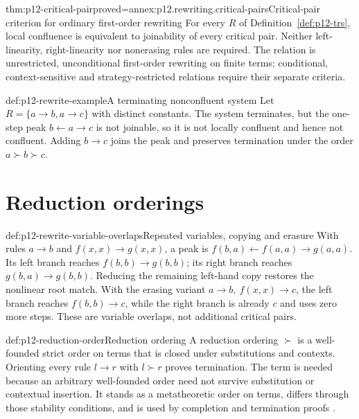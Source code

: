 \begin{hbtheorem}{thm:p12-critical-pair}{proved=annex:p12.rewriting.critical-pairs}{Critical-pair criterion for ordinary first-order rewriting}
For every \(R\) of Definition~\ref{def:p12-trs}, local confluence is
equivalent to joinability of every critical pair. Neither left-linearity,
right-linearity nor nonerasing rules are required. The relation is
unrestricted, unconditional first-order rewriting on finite terms;
conditional, context-sensitive and strategy-restricted relations require
their separate criteria.
\end{hbtheorem}

\begin{hbexample}{def:p12-rewrite-example}{A terminating nonconfluent system}
Let \(R=\{a\to b,a\to c\}\) with distinct constants. The system terminates,
but the one-step peak \(b\leftarrow a\to c\) is not joinable, so it is not
locally confluent and hence not confluent. Adding \(b\to c\) joins the peak
and preserves termination under the order \(a\succ b\succ c\).
\end{hbexample}

\section{Reduction orderings}

\begin{hbexample}{def:p12-rewrite-variable-overlaps}{Repeated variables, copying and erasure}
With rules \(a\to b\) and \(f(x,x)\to g(x,x)\), a peak is
\(f(b,a)\leftarrow f(a,a)\to g(a,a)\).
Its left branch reaches \(f(b,b)\to g(b,b)\); its right branch
reaches \(g(b,a)\to g(b,b)\). Reducing the remaining left-hand
copy restores the nonlinear root match. With the erasing variant
\(a\to b,\ f(x,x)\to c\), the left branch reaches
\(f(b,b)\to c\), while the right branch is already \(c\) and
uses zero more steps. These are variable overlaps, not additional
critical pairs.
\end{hbexample}

\begin{hbdefinition}{def:p12-reduction-order}{Reduction ordering}
A reduction ordering \(\succ\) is a well-founded strict order on terms that is
closed under substitutions and contexts. Orienting every rule \(l\to r\) with
\(l\succ r\) proves termination. The term is needed because an arbitrary
well-founded order need not survive substitution or contextual insertion. It
stands as a metatheoretic order on terms, differs through those stability
conditions, and is used by completion and termination proofs
\cite{Dershowitz1982,BaaderNipkow1998}.
\end{hbdefinition}

